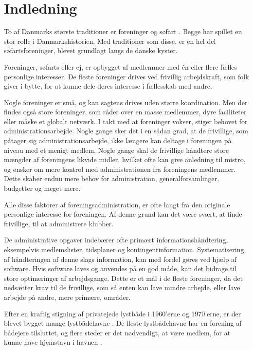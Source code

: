 \pagestyle{BasicStyle}
\setcounter{page}{1}
\chapter{Indledning}
To af Danmarks største traditioner er foreninger og søfart \cite{forening2010,moller1997}. Begge har spillet en stor rolle i Danmarkshistorien. Med traditioner som disse, er en hel del søfartsforeninger, blevet grundlagt langs de danske kyster. 

Foreninger, søfarts eller ej, er opbygget af medlemmer med én eller flere fælles personlige interesser. De fleste foreninger drives ved frivillig arbejdskraft, som folk giver i bytte, for at kunne dele deres interesse i fællesskab med andre. 

Nogle foreninger er små, og kan sagtens drives uden større koordination. Men der findes også store foreninger, som råder over en masse medlemmer, dyre faciliteter eller måske et globalt netværk. I takt med at foreninger vokser, stiger behovet for administrationsarbejde. Nogle gange sker det i en sådan grad, at de frivillige, som påtager sig administrationsarbejde, ikke længere kan deltage i foreningen på niveau med et menigt medlem. Nogle gange skal de frivillige håndtere store mængder af foreningens likvide midler, hvilket ofte kan give anledning til mistro, og ønsker om mere kontrol med administrationen fra foreningens medlemmer. Dette skaber endnu mere behov for administration, generalforsamlinger, budgetter og meget mere.

Alle disse faktorer af foreningsadministration, er ofte langt fra den originale personlige interesse for foreningen. Af denne grund kan det være svært, at finde frivillige, til at administrere klubber.

De administrative opgaver indebærer ofte primært informationshåndtering, eksempelvis medlemslister, tidsplaner og kontingentinformation. Systematisering, af håndteringen af denne slags information, kan med fordel gøres ved hjælp af software. Hvis software laves og anvendes på en god måde, kan det bidrage til store optimeringer af arbejdsgange. Dette er et mål i de fleste foreninger, da det nedsætter krav til de frivillige, som så enten kan lave mindre arbejde, eller lave arbejde på andre, mere primære, områder.

Efter en kraftig stigning af privatejede lystbåde i 1960'erne og 1970'erne, er der blevet bygget mange lystbådehavne \cite{gyldendal_redaktionen_havn_2013}. De fleste lystbådehavne har en forening af bådejere tilsluttet, og flere steder er det nødvendigt, at være medlem, for at kunne have hjemstavn i havnen \cite{int_vb_sl}.

